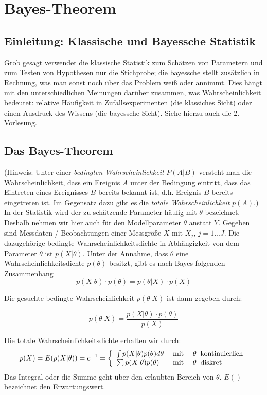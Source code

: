 
\section{Bayes-Theorem}
\subsection{Einleitung: Klassische und Bayessche Statistik}
Grob gesagt verwendet die klassische Statistik zum Schätzen von Parametern
und zum Testen von Hypothesen nur die Stichprobe; die bayessche stellt zusätzlich in Rechnung, was man sonst noch über das Problem weiß oder 
annimmt. Dies hängt mit den unterschiedlichen Meinungen darüber zusammen,
was Wahrscheinlichkeit bedeutet: relative Häufigkeit in Zufallsexperimenten
(die klassiches Sicht) oder einen Ausdruck des Wissens (die bayessche Sicht). Siehe hierzu auch die 2. Vorlesung.

\subsection{Das Bayes-Theorem} 
(Hinweis: Unter einer \textit{bedingten Wahrscheinlichkeit} $P(A|B)$ versteht man die Wahrscheinlichkeit, dass ein Ereignis $A$ unter der Bedingung eintritt, dass das Eintreten eines Ereignisses $B$ bereits bekannt ist, d.h. Ereignis $B$ bereits eingetreten ist.
Im Gegensatz dazu gibt es die \textit{totale Wahrscheinlichkeit} $p(A)$.)\\ 
In der Statistik wird der zu schätzende Parameter häufig mit $\theta$ bezeichnet. Deshalb nehmen wir hier auch für 
den Modellparameter $\theta$ anstatt $Y$. 
Gegeben sind Messdaten / Beobachtungen einer Messgröße $X$ mit $X_j$, $j=1...J$. Die dazugehörige bedingte
Wahrscheinlichkeitsdichte in Abhängigkeit von dem Parameter $\theta$ ist $p(X|\theta)$. Unter der Annahme, dass $\theta$ eine Wahrscheinlichkeitsdichte 
$p(\theta)$ besitzt, gibt es nach Bayes folgenden Zusammenhang 
\begin{equation}
p(X|\theta)\cdot p(\theta) = p(\theta | X) \cdot p(X)
\end{equation}

Die gesuchte bedingte Wahrscheinlichkeit $p(\theta | X)$ ist dann 
gegeben durch:

\begin{equation}
p(\theta | X) = \frac{p(X|\theta)\cdot p(\theta)}{p(X)} 
\label{eq:BayesTheorem}
\end{equation}

Die totale Wahrscheinlichkeitsdichte erhalten wir durch:
\begin{equation}
p(X) = E(p(X|\theta)) = c^{-1} = \left\lbrace { 
	\begin{array}{l l l}
	\int p(X|\theta) p(\theta) d \theta &\;\mathrm{mit} \; & \theta \;\; \mathrm{kontinuierlich} \\
	\sum  p(X|\theta) p(\theta) &\;\mathrm{mit} \; & \theta \;\; \mathrm{diskret} \\
	\end{array}	
 } \right . 
\end{equation}
Das Integral oder die Summe geht über den erlaubten Bereich von $\theta$. $E()$ bezeichnet den Erwartungswert.

